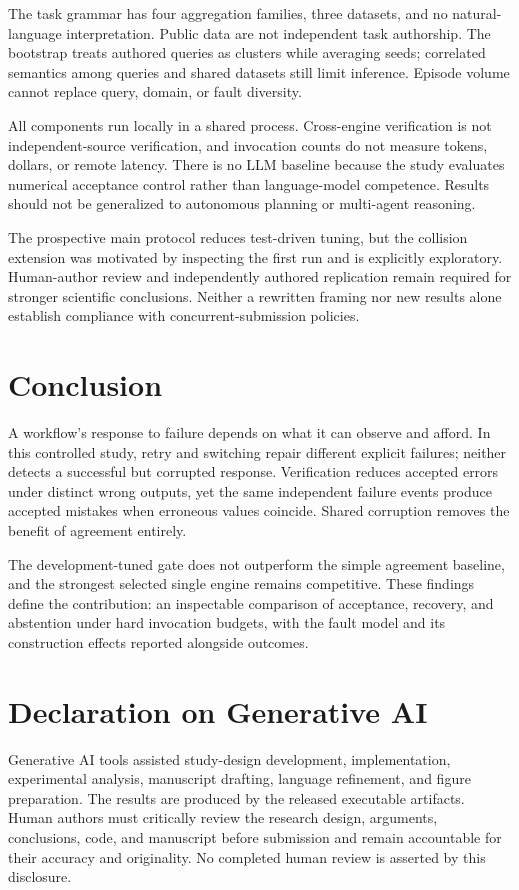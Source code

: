 \documentclass{svproc}
\begin{document}
The task grammar has four aggregation families, three datasets, and no natural-language interpretation. Public data are not independent task authorship. The bootstrap treats authored queries as clusters while averaging seeds; correlated semantics among queries and shared datasets still limit inference. Episode volume cannot replace query, domain, or fault diversity.

All components run locally in a shared process. Cross-engine verification is not independent-source verification, and invocation counts do not measure tokens, dollars, or remote latency. There is no LLM baseline because the study evaluates numerical acceptance control rather than language-model competence. Results should not be generalized to autonomous planning or multi-agent reasoning.

The prospective main protocol reduces test-driven tuning, but the collision extension was motivated by inspecting the first run and is explicitly exploratory. Human-author review and independently authored replication remain required for stronger scientific conclusions. Neither a rewritten framing nor new results alone establish compliance with concurrent-submission policies.

\section{Conclusion}
A workflow's response to failure depends on what it can observe and afford. In this controlled study, retry and switching repair different explicit failures; neither detects a successful but corrupted response. Verification reduces accepted errors under distinct wrong outputs, yet the same independent failure events produce accepted mistakes when erroneous values coincide. Shared corruption removes the benefit of agreement entirely.

The development-tuned gate does not outperform the simple agreement baseline, and the strongest selected single engine remains competitive. These findings define the contribution: an inspectable comparison of acceptance, recovery, and abstention under hard invocation budgets, with the fault model and its construction effects reported alongside outcomes.

\section*{Declaration on Generative AI}
Generative AI tools assisted study-design development, implementation, experimental analysis, manuscript drafting, language refinement, and figure preparation. The results are produced by the released executable artifacts. Human authors must critically review the research design, arguments, conclusions, code, and manuscript before submission and remain accountable for their accuracy and originality. No completed human review is asserted by this disclosure.
\end{document}
